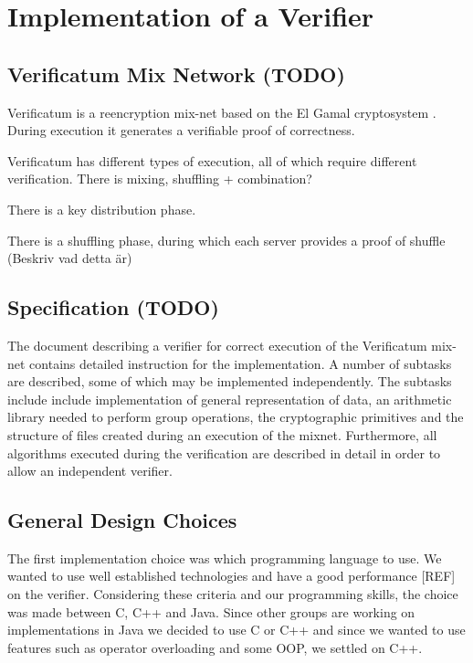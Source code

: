 \section{Implementation of a Verifier}

\subsection{Verificatum Mix Network (TODO)}

Verificatum is a reencryption mix-net based on the El Gamal
cryptosystem \cite[p.~1]{wikstrom1}. During execution it generates a
verifiable proof of correctness. 


Verificatum has different types of execution, all of which require
different verification. There is mixing, shuffling + combination?

There is a key distribution phase.

There is a shuffling phase, during which each server provides a proof
of shuffle (Beskriv vad detta är)

\subsection{Specification (TODO)}

The document describing a verifier for correct execution of the
Verificatum mix-net contains detailed instruction for the
implementation. A number of subtasks are described, some of which may
be implemented independently. The subtasks include include
implementation of general representation of data, an arithmetic
library needed to perform group operations, the cryptographic
primitives and the structure of files created during an execution of
the mixnet. Furthermore, all algorithms executed during the
verification are described in detail in order to allow an independent
verifier.

\subsection{General Design Choices}

The first implementation choice was which programming language to
use. We wanted to use well established technologies and have a good
performance [REF] on the verifier. Considering these criteria and our
programming skills, the choice was made between C, C++ and Java. Since
other groups are working on implementations in Java we decided to use
C or C++ and since we wanted to use features such as operator
overloading and some OOP, we settled on C++.

